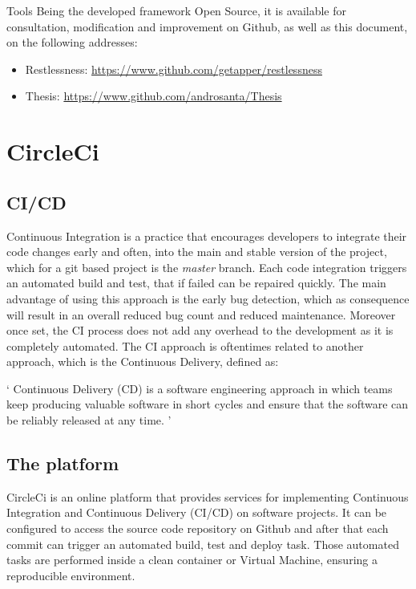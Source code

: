 \begin{chapter}{Tools}
    \bigskip
    \bigskip
    \noindent
    Being the developed framework Open Source, it is available for consultation,
    modification and improvement on Github, as well as this document, on the
    following addresses:
    \begin{itemize}
        \item Restlessness: \url{https://www.github.com/getapper/restlessness}
        \item Thesis: \url{https://www.github.com/androsanta/Thesis}
    \end{itemize}

    \section{CircleCi}

    \subsection{CI/CD}
    Continuous Integration is a practice that encourages developers to integrate
    their code changes early and often, into the main and stable version of the
    project, which for a git based project is the \textit{master} branch.
    Each code integration triggers an automated build and test, that if failed can
    be repaired quickly.
    The main advantage of using this approach is the early bug detection, which
    as consequence will result in an overall reduced bug count and reduced
    maintenance. Moreover once set, the CI process does not add any overhead to
    the development as it is completely automated.
    The CI approach is oftentimes related to another approach, which is the
    Continuous Delivery, defined as:

    \enquote*{%
        Continuous Delivery (CD) is a software engineering approach in which teams
        keep producing valuable software in short cycles and ensure that the
        software can be reliably released at any time.%
    } \cite{continuous_delivery}

    \subsection{The platform}
    CircleCi is an online platform that provides services for implementing
    Continuous Integration and Continuous Delivery (CI/CD) on software projects.
    It can be configured to access the source code repository on Github and after
    that each commit can trigger an automated build, test and deploy task.
    Those automated tasks are performed inside a clean container or Virtual Machine,
    ensuring a reproducible environment.


\end{chapter}
